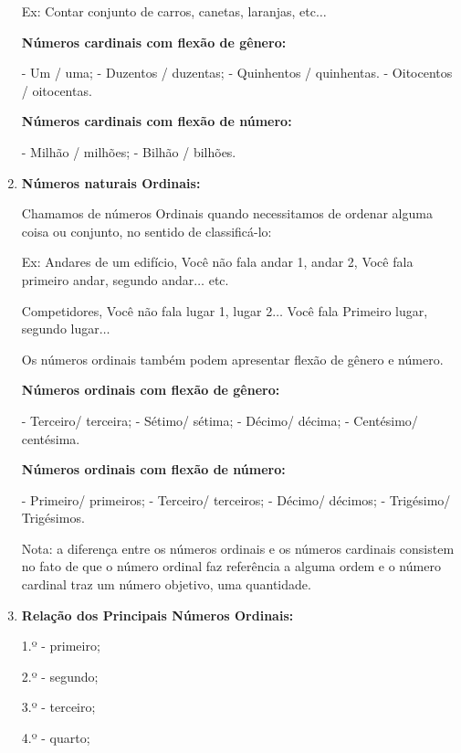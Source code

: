 \begin{multicols*}{2}
\begin{enumerate}
              Ex:  Contar conjunto de carros, canetas, laranjas, etc$\dots$

              \textbf{Números cardinais com flexão de gênero:}

              - Um / uma;
              - Duzentos / duzentas;
              - Quinhentos / quinhentas.
              - Oitocentos / oitocentas.

              \textbf{Números cardinais com flexão de número:}

              - Milhão / milhões;
              - Bilhão / bilhões.

        \item \textbf{Números naturais Ordinais:}

              Chamamos de números Ordinais quando necessitamos de ordenar alguma coisa ou conjunto, no sentido de classificá-lo:

              Ex: 	Andares de um edifício, Você não fala andar 1, andar 2, Você fala primeiro andar, segundo andar$\dots$ etc.

              Competidores, Você não fala lugar 1, lugar 2$\dots$ Você fala Primeiro lugar, segundo lugar$\dots$

              Os números ordinais também podem apresentar flexão de gênero e número.

              \textbf{Números ordinais com flexão de gênero:}

              - Terceiro/ terceira;
              - Sétimo/ sétima;
              - Décimo/ décima;
              - Centésimo/ centésima.

              \textbf{Números ordinais com flexão de número:}

              - Primeiro/ primeiros;
              - Terceiro/ terceiros;
              - Décimo/ décimos;
              - Trigésimo/ Trigésimos.

              Nota: a diferença entre os números ordinais e os números cardinais consistem no fato de que o número ordinal faz referência a alguma ordem e o número cardinal traz um número objetivo, uma quantidade.

        \item \textbf{Relação dos Principais Números Ordinais:}

              1.º - primeiro;

              2.º - segundo;

              3.º - terceiro;

              4.º - quarto;


\end{enumerate}
\end{multicols*}
